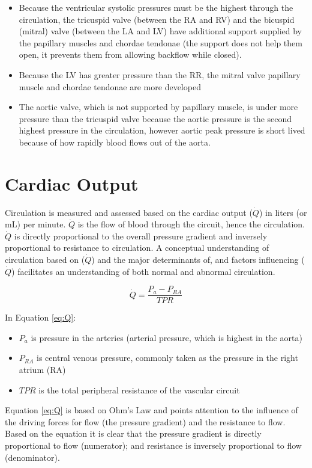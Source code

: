 \begin{itemize}
    \item Because the ventricular systolic pressures must be the highest through the circulation, the tricuspid valve (between the RA and RV) and the bicuspid (mitral) valve (between the LA and LV) have additional support supplied by the papillary muscles and chordae tendonae (the support does not help them open, it prevents them from allowing backflow while closed).
    \item Because the LV has greater pressure than the RR, the mitral valve papillary muscle and chordae tendonae are more developed
    \item The aortic valve, which is not supported by papillary muscle, is under more pressure than the tricuspid valve because the aortic pressure is the second highest pressure in the circulation, however aortic peak pressure is short lived because of how rapidly blood flows out of the aorta.
\end{itemize}

\section{Cardiac Output}

Circulation is measured and assessed based on the cardiac output ($\dot{Q}$) in liters (or mL) per minute. $\dot{Q}$ is the flow of blood through the circuit, hence the circulation. $\dot{Q}$ is directly proportional to the overall pressure gradient and inversely proportional to resistance to circulation. A conceptual understanding of circulation based on ($\dot{Q}$) and the major determinants of, and factors influencing ($\dot{Q}$) facilitates an understanding of both normal and abnormal circulation.

\begin{equation}
    \dot{Q} = \frac{P_{a} - P_{RA}}{TPR}
    \label{eq:Q}
\end{equation}

In Equation \ref{eq:Q}:
\begin{itemize}
    \item $P_{a}$ is pressure in the arteries (arterial pressure, which is highest in the aorta)
    \item $P_{RA}$ is central venous pressure, commonly taken as the pressure in the right atrium (RA)
    \item $TPR$ is the total peripheral resistance of the vascular circuit
\end{itemize}

Equation \ref{eq:Q} is based on Ohm's Law and points attention to the influence of the driving forces for flow (the pressure gradient) and the resistance to flow. Based on the equation it is clear that the pressure gradient is directly proportional to flow (numerator); and resistance is inversely proportional to flow (denominator).

